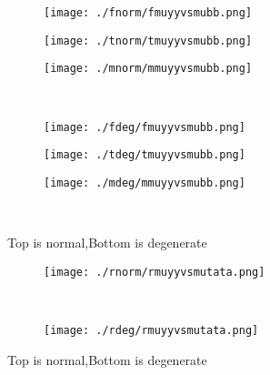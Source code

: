 \documentclass[aps,floats,floatfix,nofootinbib]{revtex4-1}
\begin{document}
\begin{center}
\begin{figure}
\begin{subfigure}{0.3\textwidth}
\texttt{[image: ./fnorm/fmuyyvsmubb.png]}
\label{}
\end{subfigure}
\begin{subfigure}{0.3\textwidth}
\texttt{[image: ./tnorm/tmuyyvsmubb.png]}
\label{}
\end{subfigure}
\begin{subfigure}{0.3\textwidth}
\texttt{[image: ./mnorm/mmuyyvsmubb.png]}
\label{}
\end{subfigure}\\
\begin{subfigure}{0.3\textwidth}
\texttt{[image: ./fdeg/fmuyyvsmubb.png]}
\label{}
\end{subfigure}
\begin{subfigure}{0.3\textwidth}
\texttt{[image: ./tdeg/tmuyyvsmubb.png]}
\label{}
\end{subfigure}
\begin{subfigure}{0.3\textwidth}
\texttt{[image: ./mdeg/mmuyyvsmubb.png]}
\label{}
\end{subfigure}\\
\caption{Top is normal,Bottom is degenerate}
\end{figure}
\end{center}

\begin{center}
\begin{figure}
\begin{subfigure}{1.0\textwidth}
\texttt{[image: ./rnorm/rmuyyvsmutata.png]}
\label{}
\end{subfigure}\\
\begin{subfigure}{1.0\textwidth}
\texttt{[image: ./rdeg/rmuyyvsmutata.png]}
\label{}
\end{subfigure}
\caption{Top is normal,Bottom is degenerate}
\end{figure}
\end{center}
\end{document}
